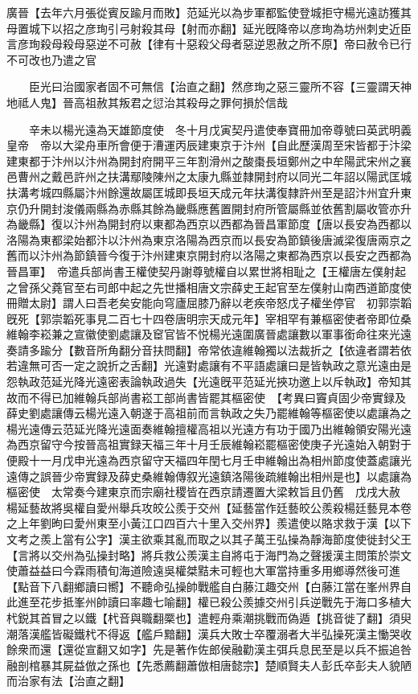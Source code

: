 廣晉【去年六月張從賓反踰月而敗】范延光以為步軍都監使登城拒守楊光遠訪獲其母置城下以招之彦珣引弓射殺其母【射而亦翻】延光旣降帝以彦珣為坊州刺史近臣言彦珣殺母殺母惡逆不可赦【律有十惡殺父母者惡逆恩赦之所不原】帝曰赦令已行不可改也乃遣之官

　　臣光曰治國家者固不可無信【治直之翻】然彦珣之惡三靈所不容【三靈謂天神地祗人鬼】晉高祖赦其叛君之愆治其殺母之罪何損於信哉

　　辛未以楊光遠為天雄節度使　冬十月戊寅契丹遣使奉寶冊加帝尊號曰英武明義皇帝　帝以大梁舟車所會便于漕運丙辰建東京于汴州【自此歷漢周至宋皆都于汴梁建東都于汴州以汴州為開封府開平三年割滑州之酸棗長垣鄭州之中牟陽武宋州之襄邑曹州之戴邑許州之扶溝鄢陵陳州之太康九縣並隸開封府以同光二年詔以陽武匡城扶溝考城四縣屬汴州餘還故屬匡城即長垣天成元年扶溝復隸許州至是詔汴州宜升東京仍升開封浚儀兩縣為赤縣其餘為畿縣應舊置開封府所管屬縣並依舊割屬收管亦升為畿縣】復以汴州為開封府以東都為西京以西都為晉昌軍節度【唐以長安為西都以洛陽為東都梁始都汴以汴州為東京洛陽為西京而以長安為節鎮後唐滅梁復唐兩京之舊而以汴州為節鎮晉今復于汴州建東京開封府以洛陽之東都為西京以長安之西都為晉昌軍】　帝遣兵部尚書王權使契丹謝尊號權自以累世將相耻之【王權唐左僕射起之曾孫父蕘官至右司郎中起之先世播相唐文宗薛史王起官至左僕射山南西道節度使冊贈太尉】謂人曰吾老矣安能向穹廬屈膝乃辭以老疾帝怒戊子權坐停官　初郭崇韜旣死【郭崇韜死事見二百七十四卷唐明宗天成元年】宰相罕有兼樞密使者帝即位桑維翰李崧兼之宣徽使劉處讓及䆠官皆不悦楊光遠圍廣晉處讓數以軍事銜命往來光遠奏請多踰分【數音所角翻分音扶問翻】帝常依違維翰獨以法裁折之【依違者謂若依若違無可否一定之說折之舌翻】光遠對處讓有不平語處讓曰是皆執政之意光遠由是怨執政范延光降光遠密表論執政過失【光遠旣平范延光挾功邀上以斥執政】帝知其故而不得已加維翰兵部尚書崧工部尚書皆罷其樞密使　【考異曰竇貞固少帝實録及薛史劉處讓傳云楊光遠入朝遂于高祖前而言執政之失乃罷維翰等樞密使以處讓為之楊光遠傳云范延光降光遠面奏維翰擅權高祖以光遠方有功于國乃出維翰領安陽光遠為西京留守今按晉高祖實録天福三年十月壬辰維翰崧罷樞密使庚子光遠始入朝對于便殿十一月戊申光遠為西京留守天福四年閏七月壬申維翰出為相州節度使蓋處讓光遠傳之誤晉少帝實録及薛史桑維翰傳叙光遠鎮洛陽後疏維翰出相州是也】以處讓為樞密使　太常奏今建東京而宗廟社稷皆在西京請遷置大梁敕旨且仍舊　戊戌大赦　楊延藝故將吳權自愛州舉兵攻皎公羨于交州【延藝當作廷藝皎公羨殺楊廷藝見本卷之上年劉昫曰愛州東至小黃江口四百六十里入交州界】羨遣使以賂求救于漢【以下文考之羨上當有公字】漢主欲乘其亂而取之以其子萬王弘操為靜海節度使徙封父王【言將以交州為弘操封略】將兵救公羨漢主自將屯于海門為之聲援漢主問策於崇文使蕭益益曰今霖雨積旬海道險遠吳權桀黠未可輕也大軍當持重多用鄉導然後可進【點音下八翻鄉讀曰嚮】不聽命弘操帥戰艦自白藤江趣交州【白藤江當在峯州界自此進至花步抵峯州帥讀曰率趣七喻翻】權已殺公羨據交州引兵逆戰先于海口多植大杙鋭其首冒之以鐵【杙音與職翻橜也】遣輕舟乘潮挑戰而偽遁【挑音徙了翻】須臾潮落漢艦皆礙鐵杙不得返【艦戶黯翻】漢兵大敗士卒覆溺者大半弘操死漢主慟哭收餘衆而還【還從宣翻又如字】先是著作佐郎侯融勸漢主弭兵息民至是以兵不振追咎融剖棺暴其屍益倣之孫也【先悉薦翻蕭倣相唐懿宗】楚順賢夫人彭氏卒彭夫人貌陋而治家有法【治直之翻】

